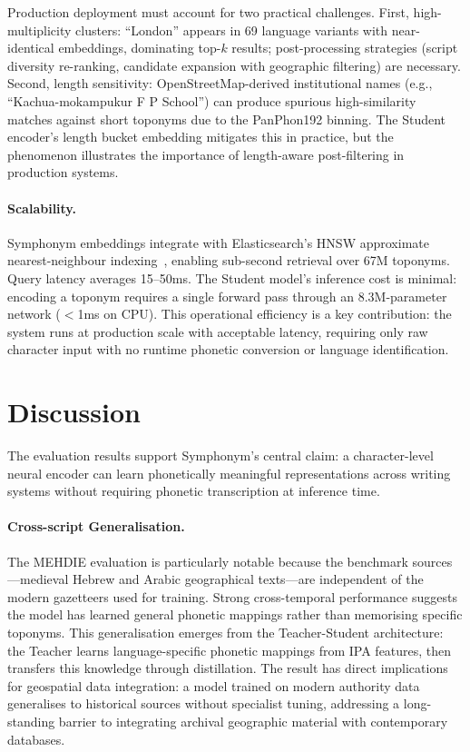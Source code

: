 \documentclass[11pt,a4paper]{article}
\begin{document}
Production deployment must account for two practical challenges. First, high-multiplicity clusters: ``London'' appears in 69 language variants with near-identical embeddings, dominating top-$k$ results; post-processing strategies (script diversity re-ranking, candidate expansion with geographic filtering) are necessary. Second, length sensitivity: OpenStreetMap-derived institutional names (e.g., ``Kachua-mokampukur F P School'') can produce spurious high-similarity matches against short toponyms due to the PanPhon192 binning. The Student encoder's length bucket embedding mitigates this in practice, but the phenomenon illustrates the importance of length-aware post-filtering in production systems.

\paragraph{Scalability.} Symphonym embeddings integrate with Elasticsearch's HNSW approximate nearest-neighbour indexing~\citep{malkov2020hnsw}, enabling sub-second retrieval over 67M toponyms. Query latency averages 15--50ms. The Student model's inference cost is minimal: encoding a toponym requires a single forward pass through an 8.3M-parameter network ($<$1ms on CPU). This operational efficiency is a key contribution: the system runs at production scale with acceptable latency, requiring only raw character input with no runtime phonetic conversion or language identification.

\section{Discussion}
\label{sec:discussion}

The evaluation results support Symphonym's central claim: a character-level neural encoder can learn phonetically meaningful representations across writing systems without requiring phonetic transcription at inference time.

\paragraph{Cross-script Generalisation.} The MEHDIE evaluation is particularly notable because the benchmark sources---medieval Hebrew and Arabic geographical texts---are independent of the modern gazetteers used for training. Strong cross-temporal performance suggests the model has learned general phonetic mappings rather than memorising specific toponyms. This generalisation emerges from the Teacher-Student architecture: the Teacher learns language-specific phonetic mappings from IPA features, then transfers this knowledge through distillation. The result has direct implications for geospatial data integration: a model trained on modern authority data generalises to historical sources without specialist tuning, addressing a long-standing barrier to integrating archival geographic material with contemporary databases.
\end{document}
